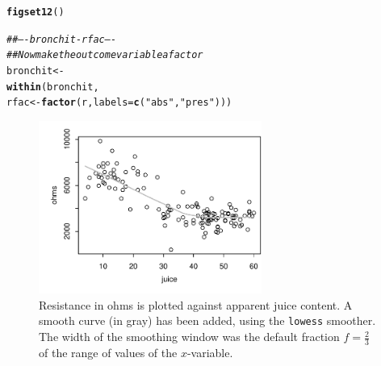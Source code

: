\documentclass[12pt, a4paper,  BCOR=8.25mm, DIV=15]{scrartcl}\usepackage[]{graphicx}\usepackage[]{color}
\makeatletter
\newcommand{\hlstr}[1]{\textcolor[rgb]{0.192,0.494,0.8}{#1}}%
\newcommand{\hlcom}[1]{\textcolor[rgb]{0.678,0.584,0.686}{\textit{#1}}}%
\newcommand{\hlstd}[1]{\textcolor[rgb]{0.345,0.345,0.345}{#1}}%
\newcommand{\hlkwb}[1]{\textcolor[rgb]{0.69,0.353,0.396}{#1}}%
\newcommand{\hlkwc}[1]{\textcolor[rgb]{0.333,0.667,0.333}{#1}}%
\newcommand{\hlkwd}[1]{\textcolor[rgb]{0.737,0.353,0.396}{\textbf{#1}}}%
\newenvironment{kframe}{%
 \def\at@end@of@kframe{}%
 \ifinner\ifhmode%
  \def\at@end@of@kframe{\end{minipage}}%
  \begin{minipage}{\columnwidth}%
 \fi\fi%
 \def\FrameCommand##1{\hskip\@totalleftmargin \hskip-\fboxsep
 \colorbox{shadecolor}{##1}\hskip-\fboxsep
     \hskip-\linewidth \hskip-\@totalleftmargin \hskip\columnwidth}%
 \MakeFramed {\advance\hsize-\width
   \@totalleftmargin\z@ \linewidth\hsize
   \@setminipage}}%
 {\par\unskip\endMakeFramed%
 \at@end@of@kframe}
\newenvironment{knitrout}{}{} %
\newcommand{\txtt}[1]{{\texttt{#1}}}
\makeatother
\begin{document}
\begin{knitrout}
\color{fgcolor}\begin{kframe}
\begin{alltt}
\hlkwd{figset12}\hlstd{()}
\end{alltt}


{\ttfamily\noindent\itshape\color{messagecolor}{\\Attaching package: 'DAAG'

The following object is masked from 'package:MASS':

\ \ \ \ hills}}\begin{alltt}
  \hlcom{## ---- bronchit-rfac ----}
\hlcom{## Now make the outcome variable a factor}
\hlstd{bronchit} \hlkwb{<-}
  \hlkwd{within}\hlstd{(bronchit,}
         \hlstd{rfac} \hlkwb{<-} \hlkwd{factor}\hlstd{(r,} \hlkwc{labels}\hlstd{=}\hlkwd{c}\hlstd{(}\hlstr{"abs"}\hlstd{,}\hlstr{"pres"}\hlstd{)))}
\end{alltt}
\end{kframe}
\end{knitrout}


\begin{figure}
\begin{knitrout}
\color{fgcolor}

{\centering \includegraphics[width=0.65\textwidth]{figs/xmeth-smooth-ohms-12_1-1} 

}



\end{knitrout}
  \caption{Resistance in ohms is plotted against apparent juice
    content.  A smooth curve (in gray) has been added, using the
    \txtt{lowess} smoother.  The width of the smoothing window was the
    default fraction $f = \frac{2}{3}$ of the range of values of the
    $x$-variable.}\label{fig:fruitohms}
\end{figure}
\end{document}

